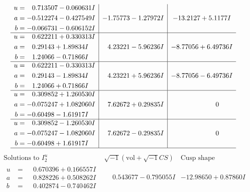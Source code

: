 \documentclass[1p]{elsarticle_modified}
\theoremstyle{definition}
\newcommand{\I}{\sqrt{-1}}
\begin{document}
$$\begin{array}{c|c|c}
\begin{aligned}
u &= \phantom{-}0.713507 - 0.060631 I \\
a &= -0.512274 - 0.427549 I \\
b &= -0.066731 - 0.606152 I\end{aligned}
 & -1.75773 - 1.27972 I & -13.2127 + 5.1177 I \\ \hline\begin{aligned}
u &= \phantom{-}0.622211 + 0.330313 I \\
a &= \phantom{-}0.29143 + 1.89834 I \\
b &= \phantom{-}1.24066 - 0.71866 I\end{aligned}
 & \phantom{-}4.23221 - 5.96236 I & -8.77056 + 6.49736 I \\ \hline\begin{aligned}
u &= \phantom{-}0.622211 - 0.330313 I \\
a &= \phantom{-}0.29143 - 1.89834 I \\
b &= \phantom{-}1.24066 + 0.71866 I\end{aligned}
 & \phantom{-}4.23221 + 5.96236 I & -8.77056 - 6.49736 I \\ \hline\begin{aligned}
u &= \phantom{-}0.309852 + 1.260530 I \\
a &= -0.075247 + 1.082060 I \\
b &= -0.60498 - 1.61917 I\end{aligned}
 & \phantom{-}7.62672 + 0.29835 I & \phantom{-0.000000 } 0 \\ \hline\begin{aligned}
u &= \phantom{-}0.309852 - 1.260530 I \\
a &= -0.075247 - 1.082060 I \\
b &= -0.60498 + 1.61917 I\end{aligned}
 & \phantom{-}7.62672 - 0.29835 I & \phantom{-0.000000 } 0\\
 \hline 
 \end{array}$$\newpage$$\begin{array}{c|c|c}  
\text{Solutions to }I^u_{2}& \I (\text{vol} + \sqrt{-1}CS) & \text{Cusp shape}\\
 \hline 
\begin{aligned}
u &= \phantom{-}0.670396 + 0.166557 I \\
a &= \phantom{-}0.828226 + 0.508262 I \\
b &= \phantom{-}0.402874 - 0.740462 I\end{aligned}
 & \phantom{-}0.543677 - 0.795055 I & -12.98650 + 0.87860 I \\ \hline\begin{aligned}

\end{aligned}
\end{array}$$
\end{document}
